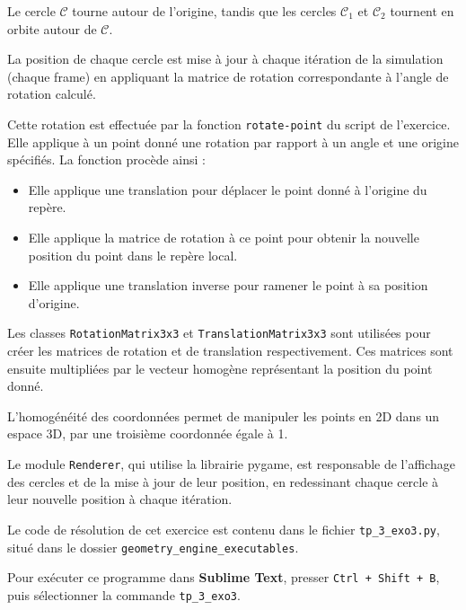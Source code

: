 \documentclass[a4paper,12pt]{article}
\begin{document}
Le cercle $\mathcal{C}$ tourne autour de l'origine, tandis que les cercles $\mathcal{C}_1$ et $\mathcal{C}_2$ tournent en orbite autour de $\mathcal{C}$.

La position de chaque cercle est mise à jour à chaque itération de la simulation (chaque frame) en appliquant la matrice de rotation correspondante à l'angle de rotation calculé.

Cette rotation est effectuée par la fonction \texttt{rotate-point} du script de l'exercice. 
Elle applique à un point donné une rotation par rapport à un angle et une origine spécifiés. La fonction procède ainsi :

\begin{itemize}
    \item Elle applique une translation pour déplacer le point donné à l'origine du repère.
    \item Elle applique la matrice de rotation à ce point pour obtenir la nouvelle position du point dans le repère local.
    \item Elle applique une translation inverse pour ramener le point à sa position d'origine.
\end{itemize}

Les classes \texttt{RotationMatrix3x3} et \texttt{TranslationMatrix3x3} sont utilisées pour créer les matrices de rotation et de translation respectivement. 
Ces matrices sont ensuite multipliées par le vecteur homogène représentant la position du point donné.

L'homogénéité des coordonnées permet de manipuler les points en 2D dans un espace 3D, par une troisième coordonnée égale à 1.

Le module \texttt{Renderer}, qui utilise la librairie pygame, est responsable de l'affichage des cercles et de la mise à jour de leur position, en redessinant chaque cercle à leur nouvelle position à chaque itération.

Le code de résolution de cet exercice est contenu dans le fichier \texttt{tp\_3\_exo3.py}, situé dans le dossier \texttt{geometry\_engine\_executables}.

Pour exécuter ce programme dans \textbf{Sublime Text}, presser \texttt{Ctrl + Shift + B}, puis sélectionner la commande \texttt{tp\_3\_exo3}.
\end{document}
